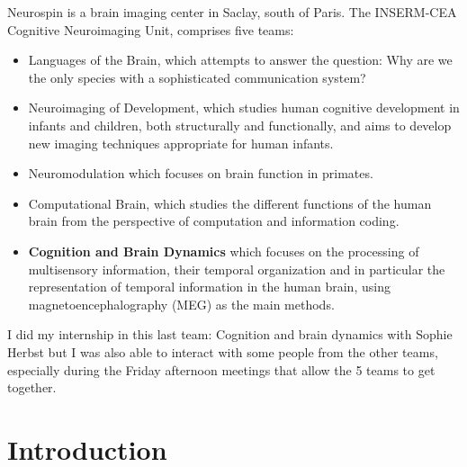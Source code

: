 Neurospin is a brain imaging center in Saclay, south of Paris. The INSERM-CEA Cognitive Neuroimaging Unit, comprises five teams:

\begin{itemize}
 \item Languages of the Brain, which attempts to answer the question: Why are we the only species with a sophisticated communication system?
 \item Neuroimaging of Development, which studies human cognitive development in infants and children, both structurally and functionally, and aims to develop new imaging techniques appropriate for human infants.
 \item Neuromodulation which focuses on brain function in primates.
 \item Computational Brain, which studies the different functions of the human brain from the perspective of computation and information coding.
 \item \textbf{Cognition and Brain Dynamics} which focuses on the processing of multisensory information, their temporal organization and in particular the representation of temporal information in the human brain, using magnetoencephalography (MEG) as the main methods.
\end{itemize}

I did my internship in this last team: Cognition and brain dynamics with Sophie Herbst but I was also able to interact with some people from the other teams, especially during the Friday afternoon meetings that allow the 5 teams to get together.





\chapter*{Introduction}



